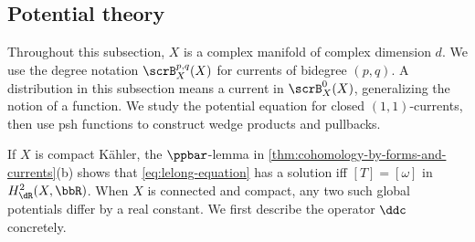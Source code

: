










\subsection[status=draft,tag=0000000,label=\labelNFM{subsec:potential-theory}]{Potential theory}

Throughout this subsection, $X$ is a complex manifold of complex dimension $d$.
We use the degree notation $\scrB_X^{p,q}(X)$ for currents of bidegree $(p,q)$.
A distribution in this subsection means a current in $\scrB_X^0(X)$, generalizing the notion of a function.
We study the potential equation for closed $(1,1)$-currents,
then use psh functions to construct wedge products and pullbacks.

\begingroup
{}
\endgroup

If $X$ is compact K\"ahler, the $\ppbar$-lemma in \cref{thm:cohomology-by-forms-and-currents}(b) shows that \cref{eq:lelong-equation} has a solution iff
$[T] = [\omega]$ in $H^2_\dR(X,\bbR)$.
When $X$ is connected and compact, any two such global potentials differ by a real constant.
We first describe the operator $\ddc$ concretely.

